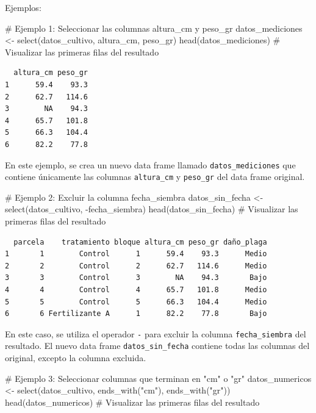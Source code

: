 \documentclass[
  spanish,
  a4paper,
  DIV=11,
  numbers=noendperiod,
  onepage,
  openany]{scrreprt}
\newenvironment{Shaded}{\begin{snugshade}}{\end{snugshade}}
\newcommand{\CommentTok}[1]{\textcolor[rgb]{0.37,0.37,0.37}{#1}}
\newcommand{\FunctionTok}[1]{\textcolor[rgb]{0.28,0.35,0.67}{#1}}
\newcommand{\NormalTok}[1]{\textcolor[rgb]{0.00,0.23,0.31}{#1}}
\newcommand{\OtherTok}[1]{\textcolor[rgb]{0.00,0.23,0.31}{#1}}
\newcommand{\SpecialCharTok}[1]{\textcolor[rgb]{0.37,0.37,0.37}{#1}}
\newcommand{\StringTok}[1]{\textcolor[rgb]{0.13,0.47,0.30}{#1}}
\begin{document}
Ejemplos:

\begin{Shaded}
\begin{Highlighting}[]
\CommentTok{\# Ejemplo 1: Seleccionar las columnas altura\_cm y peso\_gr}
\NormalTok{datos\_mediciones }\OtherTok{\textless{}{-}} \FunctionTok{select}\NormalTok{(datos\_cultivo, altura\_cm, peso\_gr)}
\FunctionTok{head}\NormalTok{(datos\_mediciones) }\CommentTok{\# Visualizar las primeras filas del resultado}
\end{Highlighting}
\end{Shaded}

\begin{verbatim}
  altura_cm peso_gr
1      59.4    93.3
2      62.7   114.6
3        NA    94.3
4      65.7   101.8
5      66.3   104.4
6      82.2    77.8
\end{verbatim}

En este ejemplo, se crea un nuevo data frame llamado
\texttt{datos\_mediciones} que contiene únicamente las columnas
\texttt{altura\_cm} y \texttt{peso\_gr} del data frame original.

\begin{Shaded}
\begin{Highlighting}[]
\CommentTok{\# Ejemplo 2: Excluir la columna fecha\_siembra}
\NormalTok{datos\_sin\_fecha }\OtherTok{\textless{}{-}} \FunctionTok{select}\NormalTok{(datos\_cultivo, }\SpecialCharTok{{-}}\NormalTok{fecha\_siembra)}
\FunctionTok{head}\NormalTok{(datos\_sin\_fecha) }\CommentTok{\# Visualizar las primeras filas del resultado}
\end{Highlighting}
\end{Shaded}

\begin{verbatim}
  parcela    tratamiento bloque altura_cm peso_gr daño_plaga
1       1        Control      1      59.4    93.3      Medio
2       2        Control      2      62.7   114.6      Medio
3       3        Control      3        NA    94.3       Bajo
4       4        Control      4      65.7   101.8      Medio
5       5        Control      5      66.3   104.4      Medio
6       6 Fertilizante A      1      82.2    77.8       Bajo
\end{verbatim}

En este caso, se utiliza el operador \texttt{-} para excluir la columna
\texttt{fecha\_siembra} del resultado. El nuevo data frame
\texttt{datos\_sin\_fecha} contiene todas las columnas del original,
excepto la columna excluida.

\begin{Shaded}
\begin{Highlighting}[]
\CommentTok{\# Ejemplo 3: Seleccionar columnas que terminan en "cm" o "gr"}
\NormalTok{datos\_numericos }\OtherTok{\textless{}{-}} \FunctionTok{select}\NormalTok{(datos\_cultivo, }\FunctionTok{ends\_with}\NormalTok{(}\StringTok{"cm"}\NormalTok{), }\FunctionTok{ends\_with}\NormalTok{(}\StringTok{"gr"}\NormalTok{))}
\FunctionTok{head}\NormalTok{(datos\_numericos) }\CommentTok{\# Visualizar las primeras filas del resultado}
\end{Highlighting}
\end{Shaded}
\end{document}

